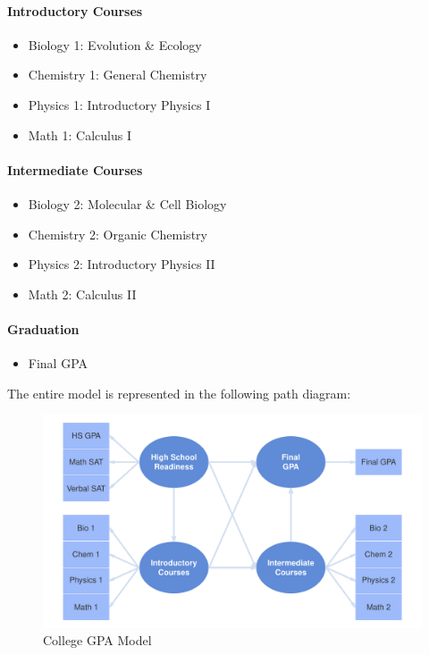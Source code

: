 \documentclass[12pt]{book}\usepackage{graphicx, color}
\newenvironment{knitrout}{}{} %
\begin{document}
\paragraph{Introductory Courses}
\begin{itemize}
 \item[] Biology 1: Evolution \& Ecology
 \item[] Chemistry 1: General Chemistry
 \item[] Physics 1: Introductory Physics I
 \item[] Math 1: Calculus I
\end{itemize}

\paragraph{Intermediate Courses}
\begin{itemize}
 \item[] Biology 2: Molecular \& Cell Biology
 \item[] Chemistry 2: Organic Chemistry 
 \item[] Physics 2: Introductory Physics II
 \item[] Math 2: Calculus II
\end{itemize}

\paragraph{Graduation}
\begin{itemize}
 \item[] Final GPA
\end{itemize}

\vspace{2mm}
The entire model is represented in the following path diagram:



\begin{knitrout}
\color{fgcolor}\begin{figure}[h]


{\centering \includegraphics[width=.95\linewidth,height=.5\linewidth]{figure/gpa_model_diagram} 

}

\caption[College GPA Model]{College GPA Model\label{fig:gpa_model_diagram}}
\end{figure}


\end{knitrout}
\end{document}
